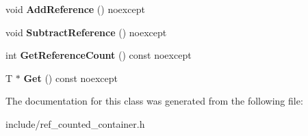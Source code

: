 \begin{DoxyCompactItemize}
void {\bfseries Add\+Reference} () noexcept
\item 
\mbox{\label{class_blade_1_1_ref_counted_container_aa356873bea32f885d723bc93ae559880}} 
void {\bfseries Subtract\+Reference} () noexcept
\item 
\mbox{\label{class_blade_1_1_ref_counted_container_a4353b01bfcfd39df50c7d8a6f68d73ec}} 
int {\bfseries Get\+Reference\+Count} () const noexcept
\item 
\mbox{\label{class_blade_1_1_ref_counted_container_aea9ac6e25ecc0775a9f91145958b6f2d}} 
T $\ast$ {\bfseries Get} () const noexcept
\end{DoxyCompactItemize}


The documentation for this class was generated from the following file\+:\begin{DoxyCompactItemize}
\item 
include/ref\+\_\+counted\+\_\+container.\+h\end{DoxyCompactItemize}
